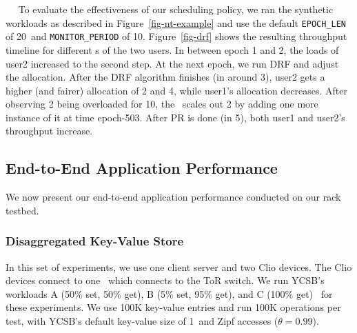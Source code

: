 ~~
To evaluate the effectiveness of our scheduling policy, we ran the synthetic workloads as described in Figure~\ref{fig-nt-example} and use the default \texttt{EPOCH\_LEN} of 20\mus\ and \texttt{MONITOR\_PERIOD} of 10\ms.
Figure~\ref{fig-drf} shows the resulting throughput timeline for different \nt{}s of the two users.
In between epoch 1 and 2, the loads of user2 increased to the second step.
At the next epoch, we run DRF and adjust the allocation. After the DRF algorithm finishes (in around 3\mus), user2 gets a higher (and fairer) allocation of \nt{}2 and \nt{}4, while user1's allocation decreases.
After observing \nt{}2 being overloaded for 10\ms, the \snic\ scales out \nt{}2 by adding one more instance of it at time epoch-503.
After PR is done (in 5\ms), both user1 and user2's throughput increase.



\subsection{End-to-End Application Performance}

We now present our end-to-end application performance conducted on our rack testbed.

\subsubsection{Disaggregated Key-Value Store}

In this set of experiments, we use one client server and two Clio devices. The Clio devices connect to one \snic\ which connects to the ToR switch. We run YCSB's workloads A (50\% set, 50\% get), B (5\% set, 95\% get), and C (100\% get)~\cite{ycsb-socc10} for these experiments. We use 100K key-value entries and run 100K operations per test, with YCSB's default key-value size of 1\KB\ and Zipf accesses ($\theta=0.99$). 


